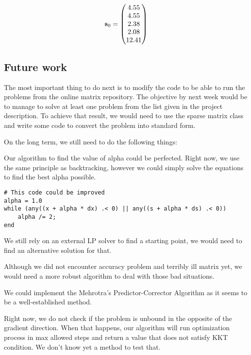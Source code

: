 \[
\boldsymbol{\mathrm{s}}_0 = \begin{pmatrix} 4.55 \\
4.55 \\
2.38 \\
2.08 \\
12.41 \end{pmatrix}
\]

\subsection{Future work}\label{section:future}

The most important thing to do next is to modify the code to be able to run the problems from the online matrix repository. The objective by next week would be to manage to solve at least one problem from the list given in the project description. To achieve that result, we would need to use the sparse matrix class and write some code to convert the problem into standard form.

On the long term, we still need to do the following things:

Our algorithm to find the value of alpha could be perfected. Right now, we use the same principle as backtracking, however we could simply solve the equations to find the best alpha possible.
\begin{lstlisting}
# This code could be improved
alpha = 1.0
while (any((x + alpha * dx) .< 0) || any((s + alpha * ds) .< 0))
    alpha /= 2;
end
\end{lstlisting}

We still rely on an external LP solver to find a starting point, we would need to find an alternative solution for that.

Although we did not encounter accuracy problem and terribly ill matrix yet, we would need a more robust algorithm to deal with those bad situations.

We could implement the Mehrotra's Predictor-Corrector Algorithm as it seems to be a well-established method.

Right now, we do not check if the problem is unbound in the opposite of the gradient direction. When that happens, our algorithm will run optimization process in max allowed steps and return a value that does not satisfy KKT condition. We don't know yet a method to test that.